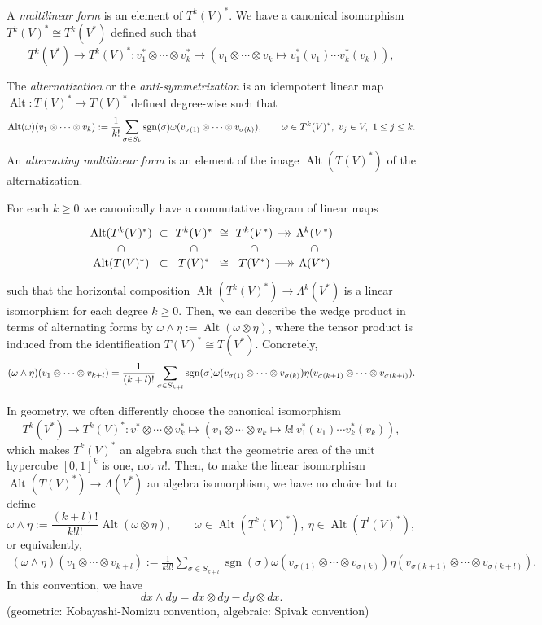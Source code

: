 \documentclass{../../large}
\newcommand{\Alt}{\operatorname{Alt}}
\begin{document}
\begin{prb}
A \emph{multilinear form} is an element of $T^k(V)^*$.
We have a canonical isomorphism $T^k(V)^*\cong T^k(V^*)$ defined such that
\[T^k(V^*)\to T^k(V)^*:v_1^*\otimes\cdots\otimes v_k^*\mapsto(v_1\otimes\cdots\otimes v_k\mapsto v_1^*(v_1)\cdots v_k^*(v_k)),\]

The \emph{alternatization} or the \emph{anti-symmetrization} is an idempotent linear map $\Alt:T(V)^*\to T(V)^*$ defined degree-wise such that
\[\Alt(\omega)(v_1\otimes\cdots\otimes v_k):=\frac1{k!}\sum_{\sigma\in S_k}\sgn(\sigma)\omega(v_{\sigma(1)}\otimes\cdots\otimes v_{\sigma(k)}),\qquad\omega\in T^k(V)^*,\ v_j\in V,\ 1\le j\le k.\]
An \emph{alternating multilinear form} is an element of the image $\operatorname{Alt}(T(V)^*)$ of the alternatization.

For each $k\ge0$ we canonically have a commutative diagram of linear maps
\[\begin{tikzcd}[sep=small]
\Alt(T^k(V)^*) \rar[phantom,"\subset"]\dar[sloped,phantom,"\subset"] & T^k(V)^* \rar[phantom,"\cong"]\dar[sloped,phantom,"\subset"] & T^k(V^*) \rar[->>]\dar[sloped,phantom,"\subset"] & \Lambda^k(V^*)\dar[sloped,phantom,"\subset"]\\
\Alt(T(V)^*) \rar[phantom,"\subset"] & T(V)^* \rar[phantom,"\cong"] & T(V^*) \rar[->>] & \Lambda(V^*)
\end{tikzcd}\]
such that the horizontal composition $\Alt(T^k(V)^*)\to\Lambda^k(V^*)$ is a linear isomorphism for each degree $k\ge0$.
Then, we can describe the wedge product in terms of alternating forms by $\omega\wedge\eta:=\Alt(\omega\otimes\eta)$, where the tensor product is induced from the identification $T(V)^*\cong T(V^*)$.
Concretely,
\[(\omega\wedge\eta)(v_1\otimes\cdots\otimes v_{k+l})=\frac1{(k+l)!}\sum_{\sigma\in S_{k+l}}\operatorname{sgn}(\sigma)\omega(v_{\sigma(1)}\otimes\cdots\otimes v_{\sigma(k)})\eta(v_{\sigma(k+1)}\otimes\cdots\otimes v_{\sigma(k+l)}).\]

\end{prb}

\begin{prb}
In geometry, we often differently choose the canonical isomorphism
\[T^k(V^*)\to T^k(V)^*:v_1^*\otimes\cdots\otimes v_k^*\mapsto(v_1\otimes\cdots\otimes v_k\mapsto k!\ v_1^*(v_1)\cdots v_k^*(v_k)),\]
which makes $T^k(V)^*$ an algebra such that the geometric area of the unit hypercube $[0,1]^k$ is one, not $n!$.
Then, to make the linear isomorphism $\Alt(T(V)^*)\to\Lambda(V^*)$ an algebra isomorphism, we have no choice but to define
\[\omega\wedge\eta:=\frac{(k+l)!}{k!l!}\Alt(\omega\otimes\eta),\qquad\omega\in\Alt(T^k(V)^*),\ \eta\in\Alt(T^l(V)^*),\]
or equivalently,
\begin{align*}
(\omega\wedge\eta)(v_1\otimes\cdots\otimes v_{k+l}):=\frac1{k!l!}\sum_{\sigma\in S_{k+l}}\operatorname{sgn}(\sigma)\omega(v_{\sigma(1)}\otimes\cdots\otimes v_{\sigma(k)})\eta(v_{\sigma(k+1)}\otimes\cdots\otimes v_{\sigma(k+l)}).
\end{align*}
In this convention, we have
\[dx\wedge dy=dx\otimes dy-dy\otimes dx.\]
(geometric: Kobayashi-Nomizu convention, algebraic: Spivak convention)

\end{prb}
\end{document}
